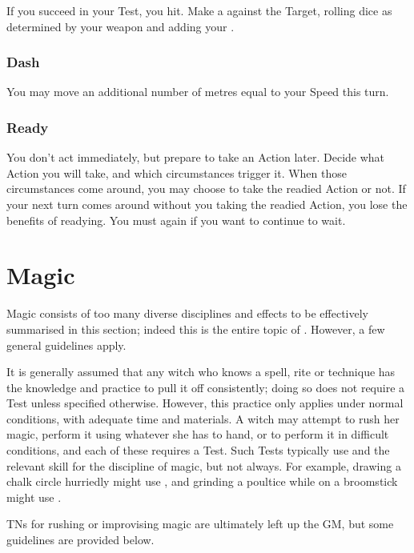 If you succeed in your Test, you hit.
Make a  against the Target, rolling dice as determined by your weapon and adding your .

\subsubsection{Dash}

You may move an additional number of metres equal to your Speed this turn.

\subsubsection{Ready}

You don't act immediately, but prepare to take an Action later.
Decide what Action you will take, and which circumstances trigger it.
When those circumstances come around, you may choose to take the readied Action or not.
If your next turn comes around without you taking the readied Action, you lose the benefits of readying.
You must  again if you want to continue to wait.

\section{Magic}

Magic consists of too many diverse disciplines and effects to be effectively summarised in this section; indeed this is the entire topic of .
However, a few general guidelines apply.

It is generally assumed that any witch who knows a spell, rite or technique has the knowledge and practice to pull it off consistently; doing so does not require a Test unless specified otherwise.
However, this practice only applies under normal conditions, with adequate time and materials.
A witch may attempt to rush her magic, perform it using whatever she has to hand, or to perform it in difficult conditions, and each of these requires a Test.
Such Tests typically use  and the relevant skill for the discipline of magic, but not always.
For example, drawing a chalk circle hurriedly might use , and grinding a poultice while on a broomstick might use .

TNs for rushing or improvising magic are ultimately left up the GM, but some guidelines are provided below.

